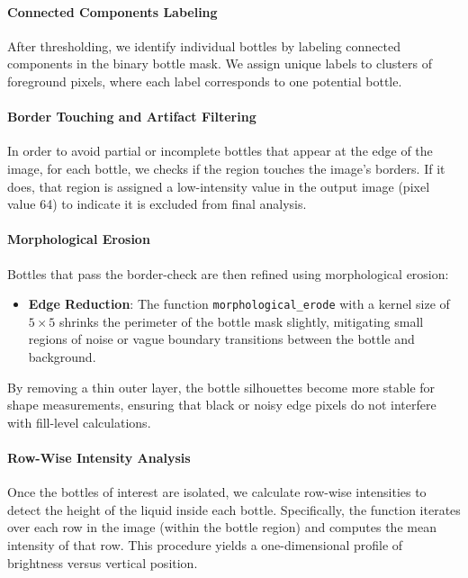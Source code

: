 \documentclass[a4paper,12pt]{article}
\begin{document}
\paragraph{Connected Components Labeling}

After thresholding, we identify individual bottles by labeling connected components in the binary bottle mask. We assign unique labels to clusters of foreground pixels, where each label corresponds to one potential bottle.

\paragraph{Border Touching and Artifact Filtering}

In order to avoid partial or incomplete bottles that appear at the edge of the image, for each bottle, we checks if the region touches the image's borders. If it does, that region is assigned a low-intensity value in the output image (pixel value 64) to indicate it is excluded from final analysis.

\paragraph{Morphological Erosion}

Bottles that pass the border-check are then refined using morphological erosion:
\begin{itemize}
    \item \textbf{Edge Reduction}: The function \texttt{morphological\_erode} with a kernel size of \(5 \times 5\) shrinks the perimeter of the bottle mask slightly, mitigating small regions of noise or vague boundary transitions between the bottle and background.
\end{itemize}
By removing a thin outer layer, the bottle silhouettes become more stable for shape measurements, ensuring that black or noisy edge pixels do not interfere with fill-level calculations.

\paragraph{Row-Wise Intensity Analysis}

Once the bottles of interest are isolated, we calculate row-wise intensities to detect the height of the liquid inside each bottle. Specifically, the function iterates over each row in the image (within the bottle region) and computes the mean intensity of that row. This procedure yields a one-dimensional profile of brightness versus vertical position. 
\end{document}
